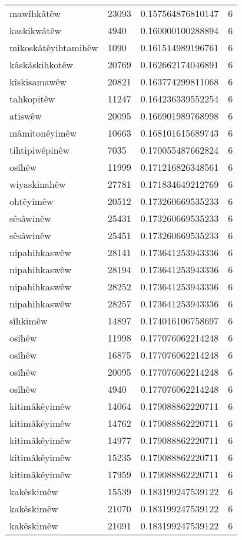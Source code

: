 \begin{longtable}{llll}
mawîhkâtêw & 23093 & 0.157564876810147 & 6\\
kaskikwâtêw & 4940 & 0.160000100288894 & 6\\
mikoskâtêyihtamihêw & 1090 & 0.161514989196761 & 6\\
kâskâskihkotêw & 20769 & 0.162662174046891 & 6\\
kîskisamawêw & 20821 & 0.163774299811068 & 6\\
tahkopitêw & 11247 & 0.164236339552254 & 6\\
atiswêw & 20095 & 0.166901989768998 & 6\\
mâmitonêyimêw & 10663 & 0.168101615689743 & 6\\
tihtipiwêpinêw & 7035 & 0.170055487662824 & 6\\
osîhêw & 11999 & 0.171216826348561 & 6\\
wiyaskinahêw & 27781 & 0.171834649212769 & 6\\
ohtêyimêw & 20512 & 0.173260669535233 & 6\\
sêsâwinêw & 25431 & 0.173260669535233 & 6\\
sêsâwinêw & 25451 & 0.173260669535233 & 6\\
nipahihkaswêw & 28141 & 0.173641253943336 & 6\\
nipahihkaswêw & 28194 & 0.173641253943336 & 6\\
nipahihkaswêw & 28252 & 0.173641253943336 & 6\\
nipahihkaswêw & 28257 & 0.173641253943336 & 6\\
sîhkimêw & 14897 & 0.174016106758697 & 6\\
osîhêw & 11998 & 0.177076062214248 & 6\\
osîhêw & 16875 & 0.177076062214248 & 6\\
osîhêw & 20095 & 0.177076062214248 & 6\\
osîhêw & 4940 & 0.177076062214248 & 6\\
kitimâkêyimêw & 14064 & 0.179088862220711 & 6\\
kitimâkêyimêw & 14762 & 0.179088862220711 & 6\\
kitimâkêyimêw & 14977 & 0.179088862220711 & 6\\
kitimâkêyimêw & 15235 & 0.179088862220711 & 6\\
kitimâkêyimêw & 17959 & 0.179088862220711 & 6\\
kakêskimêw & 15539 & 0.183199247539122 & 6\\
kakêskimêw & 21070 & 0.183199247539122 & 6\\
kakêskimêw & 21091 & 0.183199247539122 & 6\\

\end{longtable}
